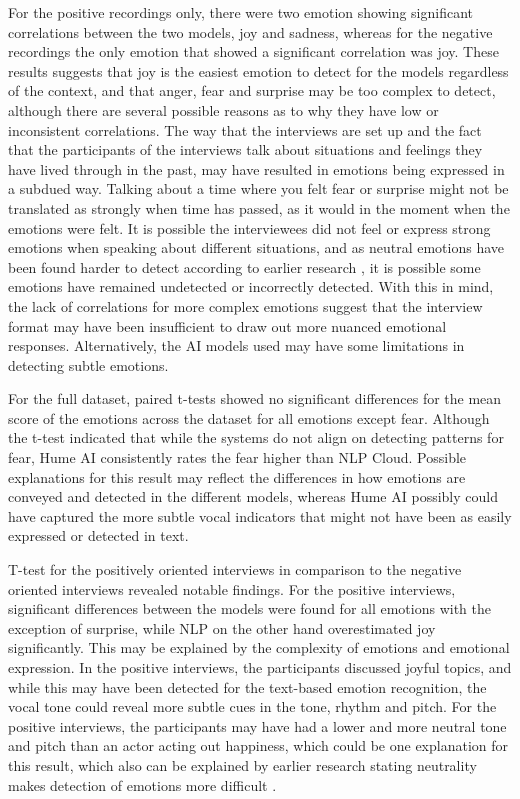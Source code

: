 For the positive recordings only, there were two emotion showing significant correlations between the two models, joy and sadness, whereas for the negative recordings the only emotion that showed a significant correlation was joy. These results suggests that joy is the easiest emotion to detect for the models regardless of the context, and that anger, fear and surprise may be too complex to detect, although there are several possible reasons as to why they have low or inconsistent correlations. The way that the interviews are set up and the fact that the participants of the interviews talk about situations and feelings they have lived through in the past, may have resulted in emotions being expressed in a subdued way. Talking about a time where you felt fear or surprise might not be translated as strongly when time has passed, as it would in the moment when the emotions were felt. It is possible the interviewees did not feel or express strong emotions when speaking about different situations, and as neutral emotions have been found harder to detect according to earlier research \autocite{Cao2015}, it is possible some emotions have remained undetected or incorrectly detected. With this in mind, the lack of correlations for more complex emotions suggest that the interview format may have been insufficient to draw out more nuanced emotional responses. Alternatively, the AI models used may have some limitations in detecting subtle emotions.

For the full dataset, paired t-tests showed no significant differences for the mean score of the emotions across the dataset for all emotions except fear. Although the t-test indicated that while the systems do not align on detecting patterns for fear, Hume AI consistently rates the fear higher than NLP Cloud. Possible explanations for this result may reflect the differences in how emotions are conveyed and detected in the different models, whereas Hume AI possibly could have captured the more subtle vocal indicators that might not have been as easily expressed or detected in text.

T-test for the positively oriented interviews in comparison to the negative oriented interviews revealed notable findings. For the positive interviews, significant differences between the models were found for all emotions with the exception of surprise, while NLP on the other hand overestimated joy significantly.
This may be explained by the complexity of emotions and emotional expression. In the positive interviews, the participants discussed joyful topics, and while this may have been detected for the text-based emotion recognition, the vocal tone could reveal more subtle cues in the tone, rhythm and pitch. For the positive interviews, the participants may have had a lower and more neutral tone and pitch than an actor acting out happiness, which could be one explanation for this result, which also can be explained by earlier research stating neutrality makes detection of emotions more difficult \autocite{Cao2015}.

